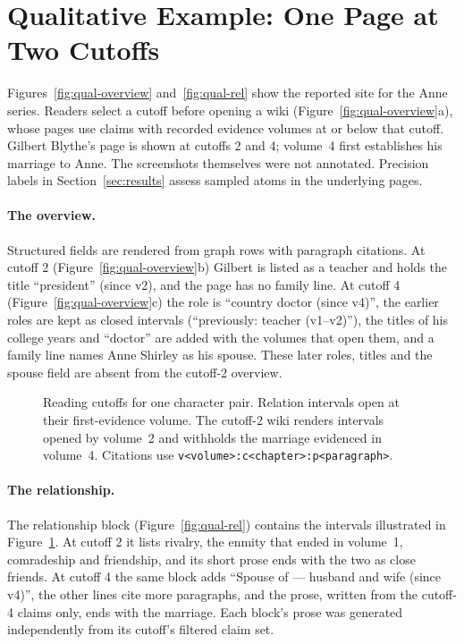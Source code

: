\section{Qualitative Example: One Page at Two Cutoffs}
\label{app:qualitative}

Figures~\ref{fig:qual-overview} and~\ref{fig:qual-rel} show the reported \sys site for the
Anne series. Readers select a cutoff before opening a wiki (Figure~\ref{fig:qual-overview}a),
whose pages use claims with recorded evidence volumes at or below that cutoff. Gilbert
Blythe's page is shown at cutoffs 2 and 4; volume~4 first establishes his marriage to Anne.
The screenshots themselves were not annotated. Precision labels in
Section~\ref{sec:results} assess sampled atoms in the underlying pages.

\paragraph{The overview.} Structured fields are rendered from graph rows with paragraph
citations. At cutoff 2 (Figure~\ref{fig:qual-overview}b) Gilbert is listed as a teacher
and holds the title ``president'' (since v2), and the page has no family line. At cutoff 4
(Figure~\ref{fig:qual-overview}c) the role is ``country doctor (since v4)'', the earlier roles
are kept as closed intervals (``previously: teacher (v1--v2)''), the titles of his college
years and ``doctor'' are added with the volumes that open them, and a family line names Anne
Shirley as his spouse. These later roles, titles and the spouse field are absent from the
cutoff-2 overview.

\ifdefined\nwvtwo %
\begin{figure}[t]
\centering

\caption{Reading cutoffs for one character pair. Relation intervals open at their
first-evidence volume. The cutoff-2 wiki renders intervals opened by volume~2 and withholds
the marriage evidenced in volume~4. Citations use \texttt{v<volume>:c<chapter>:p<paragraph>}.}
\label{fig:cutoff}
\end{figure}
\fi
\paragraph{The relationship.} The relationship block (Figure~\ref{fig:qual-rel}) contains
the intervals illustrated in Figure~\ref{fig:cutoff}. At cutoff 2 it lists rivalry, the enmity that ended
in volume~1, comradeship and friendship, and its short prose ends with the two as close
friends. At cutoff 4 the same block adds ``Spouse of --- husband and wife (since v4)'', the
other lines cite more paragraphs, and the prose, written from the cutoff-4 claims only, ends
with the marriage. Each block's prose was generated independently from its cutoff's
filtered claim set.


